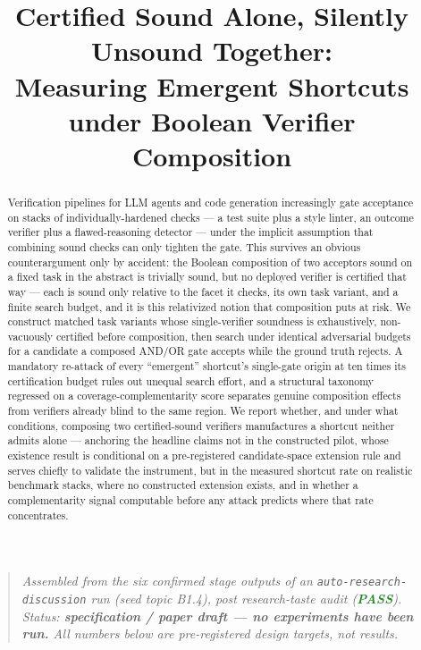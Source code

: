\documentclass[11pt]{article}
\title{\textbf{Certified Sound Alone, Silently Unsound Together:\\ Measuring Emergent Shortcuts under Boolean Verifier Composition}}
\author{}
\date{}
\begin{document}
\maketitle
\vspace{-2em}

\begin{quote}
\small\textit{Assembled from the six confirmed stage outputs of an \texttt{auto-research-discussion} run (seed topic B1.4), post research-taste audit (\textcolor{ForestGreen}{\textbf{PASS}}). Status: \textbf{specification / paper draft --- no experiments have been run.} All numbers below are pre-registered design targets, not results.}
\end{quote}

\begin{abstract}
Verification pipelines for LLM agents and code generation increasingly gate acceptance on stacks of individually-hardened checks --- a test suite plus a style linter, an outcome verifier plus a flawed-reasoning detector --- under the implicit assumption that combining sound checks can only tighten the gate. This survives an obvious counterargument only by accident: the Boolean composition of two acceptors sound on a fixed task in the abstract is trivially sound, but no deployed verifier is certified that way --- each is sound only relative to the facet it checks, its own task variant, and a finite search budget, and it is this relativized notion that composition puts at risk. We construct matched task variants whose single-verifier soundness is exhaustively, non-vacuously certified before composition, then search under identical adversarial budgets for a candidate a composed AND/OR gate accepts while the ground truth rejects. A mandatory re-attack of every ``emergent'' shortcut's single-gate origin at ten times its certification budget rules out unequal search effort, and a structural taxonomy regressed on a coverage-complementarity score separates genuine composition effects from verifiers already blind to the same region. We report whether, and under what conditions, composing two certified-sound verifiers manufactures a shortcut neither admits alone --- anchoring the headline claims not in the constructed pilot, whose existence result is conditional on a pre-registered candidate-space extension rule and serves chiefly to validate the instrument, but in the measured shortcut rate on realistic benchmark stacks, where no constructed extension exists, and in whether a complementarity signal computable before any attack predicts where that rate concentrates.
\end{abstract}
\end{document}

